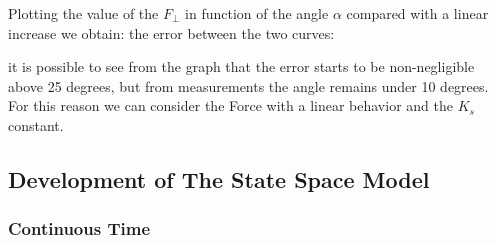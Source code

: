                 Plotting the value of the $F_\perp$ in function of the angle $\alpha$ compared with a linear increase we obtain:
                the error between the two curves:

                it is possible to see from the graph that the error starts to be non-negligible above 25 degrees, but from measurements the angle remains under 10 degrees. For this reason we can consider the Force with a linear behavior and the $K_s$ constant.

        \subsection{Development of The State Space Model}
            \subsubsection{Continuous Time}

